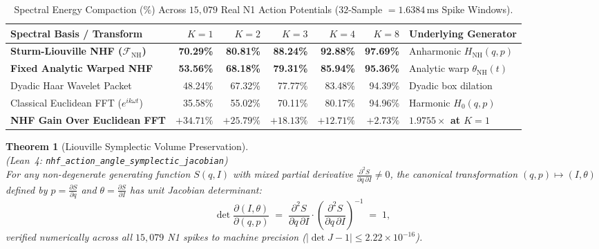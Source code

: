 \documentclass[11pt,letterpaper]{article}
\newcommand{\lean}[1]{\nolinkurl{#1}}
\newtheorem{theorem}{Theorem}[section]
\theoremstyle{definition}
\begin{document}
\begin{table}[htbp]
\centering
\caption{Spectral Energy Compaction ($\%$) Across $15{,}079$ Real N1 Action Potentials ($32$-Sample $= 1.6384\,\text{ms}$ Spike Windows).}
\label{tab:nhf_compaction}
\scriptsize
\setlength{\tabcolsep}{3.6pt}
\begin{tabular}{@{}lrrrrrl@{}}
\toprule
\textbf{Spectral Basis / Transform} & $K=1$ & $K=2$ & $K=3$ & $K=4$ & $K=8$ & \textbf{Underlying Generator} \\
\midrule
\textbf{Sturm-Liouville NHF ($\mathcal{F}_{\mathrm{NH}}$)} & \textbf{70.29\%} & \textbf{80.81\%} & \textbf{88.24\%} & \textbf{92.88\%} & \textbf{97.69\%} & Anharmonic $H_{\mathrm{NH}}(q,p)$ \\
\textbf{Fixed Analytic Warped NHF} & \textbf{53.56\%} & \textbf{68.18\%} & \textbf{79.31\%} & \textbf{85.94\%} & \textbf{95.36\%} & Analytic warp $\theta_{\mathrm{NH}}(t)$ \\
Dyadic Haar Wavelet Packet & 48.24\% & 67.32\% & 77.77\% & 83.48\% & 94.39\% & Dyadic box dilation \\
Classical Euclidean FFT ($e^{ik\omega t}$) & 35.58\% & 55.02\% & 70.11\% & 80.17\% & 94.96\% & Harmonic $H_0(q,p)$ \\
\midrule
\textbf{NHF Gain Over Euclidean FFT} & \textbf{$+34.71\%$} & \textbf{$+25.79\%$} & \textbf{$+18.13\%$} & \textbf{$+12.71\%$} & \textbf{$+2.73\%$} & \textbf{$1.9755\times$ at $K=1$} \\
\bottomrule
\end{tabular}
\end{table}

\begin{theorem}[Liouville Symplectic Volume Preservation]
\label{thm:t10}
~\\
(\emph{Lean~4:} \lean{nhf_action_angle_symplectic_jacobian})\\
For any non-degenerate generating function $S(q,I)$ with mixed partial derivative $\frac{\partial^2 S}{\partial q\,\partial I} \neq 0$, the canonical transformation $(q,p)\mapsto(I,\theta)$ defined by $p = \frac{\partial S}{\partial q}$ and $\theta = \frac{\partial S}{\partial I}$ has unit Jacobian determinant:
\begin{equation}
\label{eq:t10_liouville}
\det\frac{\partial(I,\theta)}{\partial(q,p)}
\;=\;
\frac{\partial^2 S}{\partial q\,\partial I}\cdot\left(\frac{\partial^2 S}{\partial q\,\partial I}\right)^{-1}
\;=\; 1,
\end{equation}
verified numerically across all $15{,}079$ N1 spikes to machine precision ($|\det J - 1| \le 2.22\times 10^{-16}$).
\end{theorem}
\end{document}
